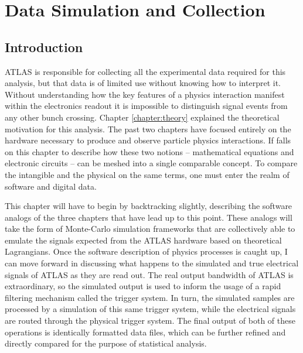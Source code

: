 \chapter{Data Simulation and Collection} \label{chapter:data}

\section{Introduction}
    
    ATLAS is responsible for collecting all the experimental data required for this analysis,
        but that data is of limited use without knowing how to interpret it.
    Without understanding how the key features of a physics interaction manifest within the electronics readout
        it is impossible to distinguish signal events from any other bunch crossing.
    Chapter \ref{chapter:theory} explained the theoretical motivation for this analysis.
    The past two chapters have focused entirely on the hardware necessary to produce and observe particle physics interactions.
    If falls on this chapter to describe how these two notions --
        mathematical equations and electronic circuits -- can be meshed into a single comparable concept.
    To compare the intangible and the physical on the same terms,
        one must enter the realm of software and digital data.

    This chapter will have to begin by backtracking slightly,
        describing the software analogs of the three chapters that have lead up to this point.
    These analogs will take the form of Monte-Carlo simulation frameworks
        that are collectively able to emulate the signals expected from the ATLAS hardware
        based on theoretical Lagrangians.
    Once the software description of physics processes is caught up,
        I can move forward in discussing what happens to the
        simulated and true electrical signals of ATLAS as they are read out.
    The real output bandwidth of ATLAS is extraordinary,
        so the simulated output is used to inform the usage of
        a rapid filtering mechanism called the trigger system.
    In turn, the simulated samples are processed by a simulation of this same trigger system,
        while the electrical signals are routed through the physical trigger system.
    The final output of both of these operations is identically formatted data files,
        which can be further refined and directly compared for the purpose of statistical analysis.
        


